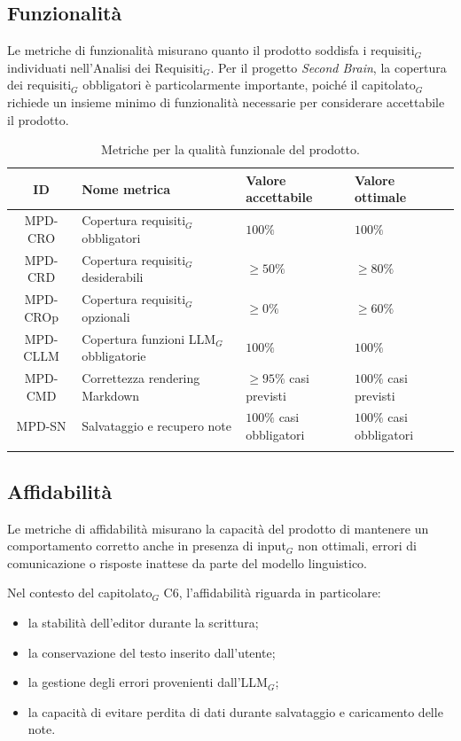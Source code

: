 \documentclass[a4paper, 10pt, colorlinks=true, linkcolor=black, urlcolor=blue, citecolor=blue, hidelinks]{article}
\begin{document}
\subsection{Funzionalità}

Le metriche di funzionalità misurano quanto il prodotto soddisfa i requisiti$_G$ individuati nell'Analisi dei Requisiti$_G$. Per il progetto \textit{Second Brain}, la copertura dei requisiti$_G$ obbligatori è particolarmente importante, poiché il capitolato$_G$ richiede un insieme minimo di funzionalità necessarie per considerare accettabile il prodotto.

\begingroup
\small
\renewcommand{\arraystretch}{1.25}
\begin{longtable}{|c|p{4cm}|p{3cm}|p{3cm}|}
    \hline
    \textbf{ID} & \textbf{Nome metrica} & \textbf{Valore accettabile} & \textbf{Valore ottimale} \\
    \hline
    \endhead

    MPD-CRO & Copertura requisiti$_G$ obbligatori & $100\%$ & $100\%$ \\ \hline
    MPD-CRD & Copertura requisiti$_G$ desiderabili & $\geq 50\%$ & $\geq 80\%$ \\ \hline
    MPD-CROp & Copertura requisiti$_G$ opzionali & $\geq 0\%$ & $\geq 60\%$ \\ \hline
    MPD-CLLM & Copertura funzioni LLM$_G$ obbligatorie & $100\%$ & $100\%$ \\ \hline
    MPD-CMD & Correttezza rendering Markdown & $\geq 95\%$ casi previsti & $100\%$ casi previsti \\ \hline
    MPD-SN & Salvataggio e recupero note & $100\%$ casi obbligatori & $100\%$ casi obbligatori \\ \hline

    \caption{Metriche per la qualità funzionale del prodotto.}
    \label{tab:metriche-funzionalita}
\end{longtable}
\endgroup

\subsection{Affidabilità}

Le metriche di affidabilità misurano la capacità del prodotto di mantenere un comportamento corretto anche in presenza di input$_G$ non ottimali, errori di comunicazione o risposte inattese da parte del modello linguistico.

Nel contesto del capitolato$_G$ C6, l'affidabilità riguarda in particolare:
\begin{itemize}
    \item la stabilità dell'editor durante la scrittura;
    \item la conservazione del testo inserito dall'utente;
    \item la gestione degli errori provenienti dall'LLM$_G$;
    \item la capacità di evitare perdita di dati durante salvataggio e caricamento delle note.
\end{itemize}
\end{document}
